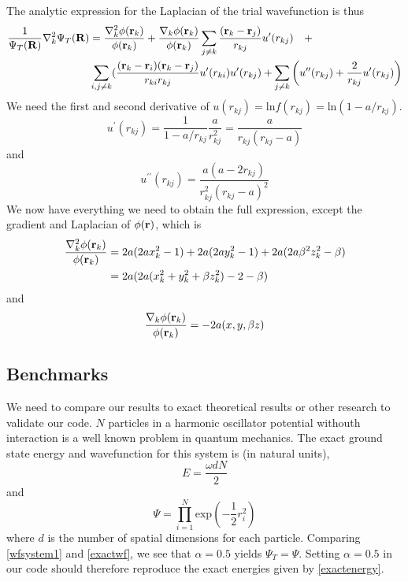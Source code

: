 \documentclass[english, a4paper]{article}
\begin{document}
The analytic expression for the Laplacian of the trial wavefunction is thus
\begin{align}
 \frac{1}{\Psi_T({\bf R})}\nabla^2_k\Psi_T({\bf R}) &= 
 \frac{\nabla^2_k\phi({\bf r}_k)}{\phi({\bf r}_k)} + \frac{\nabla_k\phi({\bf r}_k)}{\phi({\bf r}_k)} 
 \sum_{j\neq k}\frac{({\bf r}_k - {\bf r}_j)}{r_{kj}} u^\prime(r_{kj}) \quad + \\
 &\sum_{i,j\neq k} (\frac{({\bf r}_k - {\bf r}_i)({\bf r}_k - {\bf r}_j)}{r_{ki}r_{kj}} u^\prime(r_{ki})u^\prime(r_{kj})
 + \sum_{j\neq k}\left( u^{\prime\prime}(r_{kj}) + \frac{2}{r_{kj}} u^\prime(r_{kj}) \right)
 \label{analytickin}
\end{align}
We need the first and second derivative of $u(r_{kj}) = \textrm{ln} f(r_{kj}) = \textrm{ln} (1-a/r_{kj})$.
\begin{equation}
 u^\prime(r_{kj}) = \frac{1}{1-a/r_{kj}} 
 \frac{a}{r^2_{kj}} = \frac{a}{r_{kj}(r_{kj} - a)}
\end{equation}
and
\begin{equation}
 u^{\prime\prime}(r_{kj}) = \frac{a(a - 2r_{kj})}{r_{kj}^2 ( r_{kj} - a)^2}
\end{equation}
We now have everything we need to obtain the full expression, except the gradient and Laplacian of
$\phi({\bf r})$, which is
\begin{align}
 \frac{\nabla^2_k\phi({\bf r}_k)}{\phi({\bf r}_k)} &= 2a(2ax_k^2 - 1) + 2a(2ay_k^2 - 1) + 2a(2a\beta^2z_k^2 - \beta) \\
 &= 2a(2a(x_k^2 + y_k^2 + \beta z_k^2) - 2 - \beta)
\end{align}
and
\begin{equation}
 \frac{\nabla_k\phi({\bf r}_k)}{\phi({\bf r}_k)}  = 
 -2a(x, y, \beta z)
\end{equation}


\subsection{Benchmarks}
We need to compare our results to exact theoretical results or other research to validate our code. 
$N$ particles in a harmonic oscillator potential withouth interaction
is a well known problem in quantum mechanics. 
The exact ground state energy and wavefunction for this system is (in natural units),
\begin{equation}
 E = \frac{\omega dN}{2}
 \label{exactenergy}
\end{equation}
and
\begin{equation}
 \Psi = \prod_{i=1}^N \textrm{exp}\left(-\frac{1}{2}r_i^2 \right)
 \label{exactwf}
\end{equation}
where $d$ is the number of spatial dimensions for each particle.
Comparing \eqref{wfsystem1} and \eqref{exactwf}, we see that $\alpha = 0.5$ 
yields $\Psi_T = \Psi$. Setting $\alpha = 0.5$ in our code should therefore reproduce the exact energies
given by \eqref{exactenergy}. \\
\end{document}
